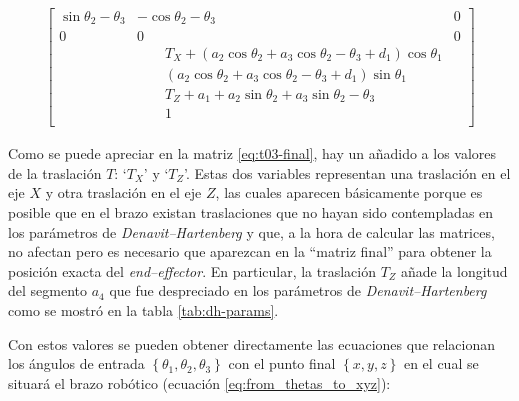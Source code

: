 \begin{align}
{\begin{bmatrix}
        \sin{\theta_{2} - \theta_{3}}                  & - \cos{\theta_{2} - \theta_{3}}                                                                                   & 0                  \\
        0                                              & 0                                                                                                                 & 0                  \\
                                                       & \qquad T_{X} + \left(a_{2} \cos{\theta_{2}} + a_{3} \cos{\theta_{2} - \theta_{3}} + d_{1}\right) \cos{\theta_{1}}                      \\
                                                       & \qquad \left(a_{2} \cos{\theta_{2}} + a_{3} \cos{\theta_{2} - \theta_{3}} + d_{1}\right) \sin{\theta_{1}}                              \\
                                                       & \qquad T_{Z} + a_{1} + a_{2} \sin{\theta_{2}} + a_{3} \sin{\theta_{2} - \theta_{3}}                                                    \\
                                                       & \qquad 1                                                                                                                               \\
    \end{bmatrix}}\label{eq:t03-final}
\end{align}

Como se puede apreciar en la matriz \ref{eq:t03-final}, hay un añadido a los valores
de la traslación $T$: `$T_X$' y `$T_Z$'. Estas dos variables representan una traslación en el
eje $X$ y otra traslación en el eje $Z$, las cuales aparecen básicamente
porque es posible que en el brazo existan traslaciones que no hayan sido contempladas
en los parámetros de \textit{Denavit--Hartenberg} y que, a la hora de calcular las matrices,
no afectan pero es necesario que aparezcan en la ``matriz final'' para obtener la posición 
exacta del \textit{end--effector}. En particular, la traslación $T_Z$ añade la longitud del 
segmento $a_4$ que fue despreciado en los parámetros de \textit{Denavit--Hartenberg} como se 
mostró en la tabla \ref{tab:dh-params}.

Con estos valores se pueden obtener directamente las ecuaciones que relacionan
los ángulos de entrada $\left\{\theta_1, \theta_2, \theta_3\right\}$ con el punto
final $\left\{x, y, z\right\}$ en el cual se situará el brazo robótico (ecuación
\ref{eq:from_thetas_to_xyz}):

